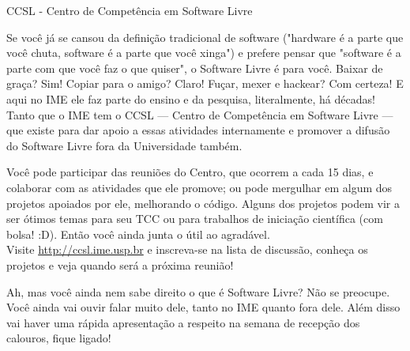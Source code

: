 \begin{secao}{CCSL - Centro de Competência em Software Livre}

Se você já se cansou da definição tradicional de software ("hardware é a parte
que você chuta, software é a parte que você xinga") e prefere pensar que
"software é a parte com que você faz o que quiser", o Software Livre é para você. 
Baixar de graça? Sim! Copiar para o amigo? Claro! Fuçar, mexer e hackear? Com
 certeza! E aqui no IME ele faz parte do ensino e da pesquisa, literalmente, há
 décadas! Tanto que o IME tem o CCSL --- Centro de Competência em Software Livre
 --- que existe para dar apoio a essas atividades internamente e promover a
 difusão do Software Livre fora da Universidade também.

Você pode participar das reuniões do Centro, que ocorrem a cada 15 dias, e
 colaborar com as atividades que ele promove; ou pode mergulhar em algum dos
 projetos apoiados por ele, melhorando o código. Alguns dos projetos podem vir a
 ser ótimos temas para seu TCC ou para trabalhos de iniciação científica (com
 bolsa! :D). Então você ainda junta o útil ao agradável.\\
Visite \url{http://ccsl.ime.usp.br} e inscreva-se na lista de discussão,
 conheça os projetos e veja quando será a próxima reunião!

Ah, mas você ainda nem sabe direito o que é Software Livre? Não se preocupe.
 Você ainda vai ouvir falar muito dele, tanto no IME quanto fora dele. Além disso vai
 haver uma rápida apresentação a respeito na semana de recepção dos calouros, fique ligado!

\end{secao}
